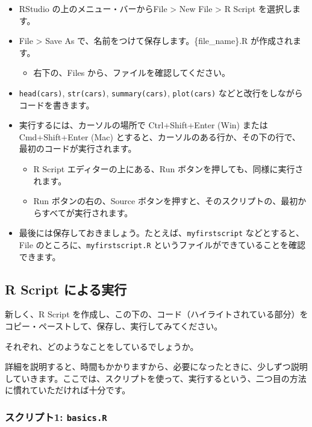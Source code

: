 \documentclass[
  xelatex, ja=standard]{bxjsbook}
\providecommand{\tightlist}{%
  \setlength{\itemsep}{0pt}\setlength{\parskip}{0pt}}
\theoremstyle{definition}
\theoremstyle{definition}
\theoremstyle{definition}
\theoremstyle{definition}
\theoremstyle{remark}
\begin{document}
\begin{itemize}
\tightlist
\item
  RStudio の上のメニュー・バーからFile \textgreater{} New File \textgreater{} R Script を選択します。
\item
  File \textgreater{} Save As で、名前をつけて保存します。\{file\_name\}.R が作成されます。

  \begin{itemize}
  \tightlist
  \item
    右下の、Files から、ファイルを確認してください。
  \end{itemize}
\item
  \texttt{head(cars)}, \texttt{str(cars)}, \texttt{summary(cars)}, \texttt{plot(cars)} などと改行をしながらコードを書きます。
\item
  実行するには、カーソルの場所で Ctrl+Shift+Enter (Win) または Cmd+Shift+Enter (Mac) とすると、カーソルのある行か、その下の行で、最初のコードが実行されます。

  \begin{itemize}
  \tightlist
  \item
    R Script エディターの上にある、Run ボタンを押しても、同様に実行されます。
  \item
    Run ボタンの右の、Source ボタンを押すと、そのスクリプトの、最初からすべてが実行されます。
  \end{itemize}
\item
  最後には保存しておきましょう。たとえば、\texttt{myfirstscript} などとすると、File のところに、\texttt{myfirstscript.R} というファイルができていることを確認できます。
\end{itemize}

\hypertarget{r-script-ux306bux3088ux308bux5b9fux884c}{%
\subsection{R Script による実行}\label{r-script-ux306bux3088ux308bux5b9fux884c}}

新しく、R Script を作成し、この下の、コード（ハイライトされている部分）をコピー・ペーストして、保存し、実行してみてください。

それぞれ、どのようなことをしているでしょうか。

詳細を説明すると、時間もかかりますから、必要になったときに、少しずつ説明していきます。ここでは、スクリプトを使って、実行するという、二つ目の方法に慣れていただければ十分です。

\hypertarget{ux30b9ux30afux30eaux30d7ux30c81-basics.r}{%
\subsubsection{\texorpdfstring{スクリプト1: \texttt{basics.R}}{スクリプト1: basics.R}}\label{ux30b9ux30afux30eaux30d7ux30c81-basics.r}}
\end{document}
